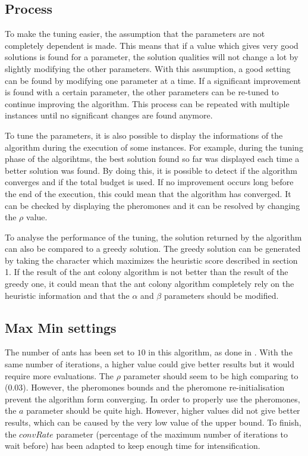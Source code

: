 \documentclass{article}
\begin{document}
\subsection{Process}

To make the tuning easier, the assumption that the parameters are not completely dependent is made.
This means that if a value which gives very good solutions is found for a parameter, the solution qualities will not change a lot by slightly modifying the other parameters.
With this assumption, a good setting can be found by modifying one parameter at a time.
If a significant improvement is found with a certain parameter, the other parameters can be re-tuned to continue improving the algorithm.
This process can be repeated with multiple instances until no significant changes are found anymore.\newline

To tune the parameters, it is also possible to display the informations of the algorithm during the execution of some instances.
For example, during the tuning phase of the algorihtms, the best solution found so far was displayed each time a better solution was found.
By doing this, it is possible to detect if the algorithm converges and if the total budget is used.
If no improvement occurs long before the end of the execution, this could mean that the algorithm has converged.
It can be checked by displaying the pheromones and it can be resolved by changing the $\rho$ value.\newline

To analyse the performance of the tuning, the solution returned by the algorithm can also be compared to a greedy solution.
The greedy solution can be generated by taking the character which maximizes the heuristic score described in section 1.
If the result of the ant colony algorithm is not better than the result of the greedy one, it could mean that the ant colony algorithm completely rely on the heuristic information and that the $\alpha$ and $\beta$ parameters should be modified.

\subsection{Max Min settings}

The number of ants has been set to $10$ in this algorithm, as done in \cite{aco_csp}.
With the same number of iterations, a higher value could give better results but it would require more evaluations.
The $\rho$ parameter should seem to be high comparing to \cite{aco_csp} (0.03).
However, the pheromones bounds and the pheromone re-initialisation prevent the algorithm form converging.
In order to properly use the pheromones, the $a$ parameter should be quite high.
However, higher values did not give better results, which can be caused by the very low value of the upper bound.
To finish, the $convRate$ parameter (percentage of the maximum number of iterations to wait before) has been adapted to keep enough time for intensification.\newline
\end{document}
